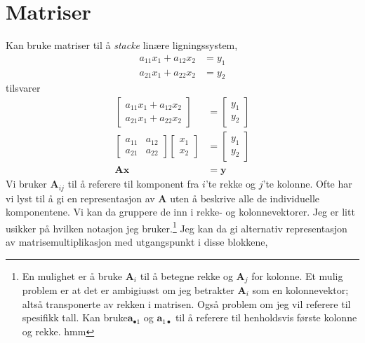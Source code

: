 \section{Matriser}
Kan bruke matriser til å \textit{stacke} linære ligningssystem,
\begin{align}
a_{11}x_1 + a_{12}x_2 &= y_1 \\
a_{21}x_1 + a_{22}x_2 &= y_2
\end{align}
tilsvarer
\begin{align}
\begin{bmatrix}
a_{11}x_1 + a_{12}x_2 \\
a_{21}x_1 + a_{22}x_2
\end{bmatrix}
&=
\begin{bmatrix}
y_1 \\
y_2
\end{bmatrix}
\\
\begin{bmatrix}
a_{11} & a_{12} \\
a_{21}&  a_{22}
\end{bmatrix}
\begin{bmatrix}
x_1 \\
x_2
\end{bmatrix}
&=
\begin{bmatrix}
y_1 \\
y_2
\end{bmatrix}
\\
\mathbf{A}\mathbf{x} &= \mathbf{y}
\end{align}
Vi bruker $\mathbf{A}_{ij}$ til å referere til komponent fra $i$'te rekke og $j$'te kolonne. Ofte har vi lyst til å gi en representasjon av $\mathbf{A}$ uten å beskrive alle de individuelle komponentene. Vi kan da gruppere de inn i rekke- og kolonnevektorer. Jeg er litt usikker på hvilken notasjon jeg bruker.\footnote{En mulighet er å bruke $\mathbf{A}_i$ til å betegne rekke og $\mathbf{A}_j$ for kolonne. Et mulig problem er at det er ambigiuøst om jeg betrakter $\mathbf{A}_i$ som en kolonnevektor; altså transponerte av rekken i matrisen. Også problem om jeg vil referere til spesifikk tall. Kan bruke$ \mathbf{a}_{\bullet 1}$ og $\mathbf{a}_{1\bullet}$ til å referere til henholdsvis første kolonne og rekke. hmm} Jeg kan da gi alternativ representasjon av matrisemultiplikasjon med utgangspunkt i disse blokkene,
